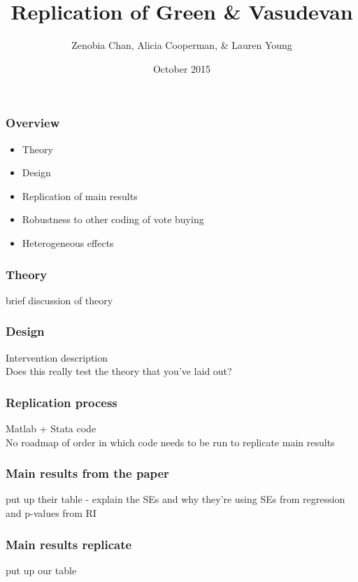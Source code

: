 \documentclass{beamer}
\institute{Columbia University}
\begin{document}
\title[SSDS]{Replication of Green \& Vasudevan}
\author{Zenobia Chan, Alicia Cooperman, \& Lauren Young}
\date{October 2015}

\begin{frame}
\titlepage
\end{frame}



\begin{frame}
\frametitle{Overview}

\begin{itemize}
\item Theory
\item Design
\item Replication of main results
\item Robustness to other coding of vote buying
\item Heterogeneous effects
\end{itemize}

\end{frame}


\begin{frame}
\frametitle{Theory}

brief discussion of theory

\end{frame}


\begin{frame}
\frametitle{Design}

Intervention description \\
Does this really test the theory that you've laid out?

\end{frame}



\begin{frame}
\frametitle{Replication process}

Matlab + Stata code \\
No roadmap of order in which code needs to be run to replicate main results 

\end{frame}


\begin{frame}
\frametitle{Main results from the paper}

put up their table - explain the SEs and why they're using SEs from regression and p-values from RI

\end{frame}



\begin{frame}
\frametitle{Main results replicate}

put up our table

\end{frame}
\end{document}
